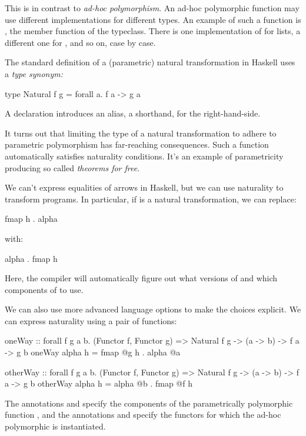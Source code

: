 \documentclass[DaoFP]{subfiles}
\begin{document}
This is in contrast to \emph{ad-hoc polymorphism}. An ad-hoc polymorphic function may use different implementations for different types. An example of such a function is , the member function of the  typeclass. There is one implementation of  for lists, a different one for , and so on, case by case. 

The standard definition of a (parametric) natural transformation in Haskell uses a \emph{type synonym:}
\begin{haskell}
type Natural f g = forall a. f a -> g a
\end{haskell}
A  declaration introduces an alias, a shorthand, for the right-hand-side.

It turns out that limiting the type of a natural transformation to adhere to parametric polymorphism has far-reaching consequences. Such a function automatically satisfies naturality conditions. It's an example of parametricity producing so called \emph{theorems for free}. 

We can't express equalities of arrows in Haskell, but we can use naturality to transform programs. In particular, if  is a natural transformation, we can replace:
\begin{haskell}
fmap h . alpha
\end{haskell}
with:
\begin{haskell}
alpha . fmap h
\end{haskell}
Here, the compiler will automatically figure out what versions of  and which components of  to use. 

We can also use more advanced language options to make the choices explicit. We can express naturality using a pair of functions: 
\begin{haskell}
oneWay :: 
  forall f g a b. (Functor f, Functor g) => 
  Natural f g -> (a -> b) -> f a -> g b
oneWay alpha h = fmap @g h . alpha @a
\end{haskell}
\begin{haskell}
otherWay :: 
  forall f g a b. (Functor f, Functor g) => 
  Natural f g -> (a -> b) -> f a -> g b
otherWay alpha h = alpha @b . fmap @f h
\end{haskell}
The annotations  and  specify the components of the parametrically polymorphic function , and the annotations  and  specify the functors for which the ad-hoc polymorphic  is instantiated.
\end{document}
